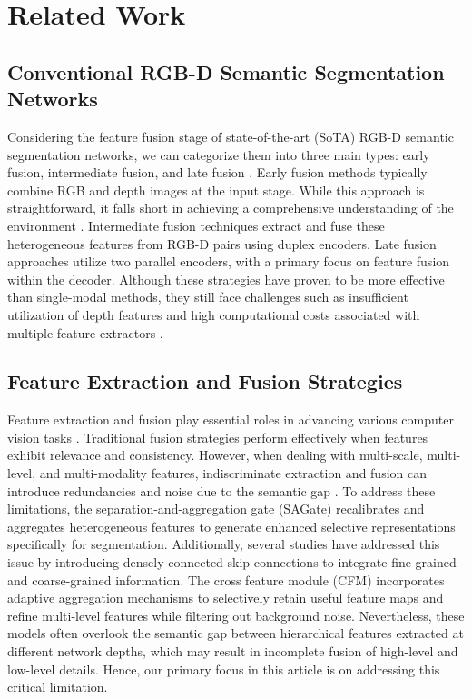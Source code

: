 \section{Related Work}
\label{sec:related_work}

\subsection{Conventional RGB-D Semantic Segmentation Networks}
\label{sec:RGB-D}
Considering the feature fusion stage of state-of-the-art (SoTA) RGB-D semantic segmentation networks, we can categorize them into three main types: early fusion, intermediate fusion, and late fusion \cite{zhang2021deep}. Early fusion methods typically combine RGB and depth images at the input stage. While this approach is straightforward, it falls short in achieving a comprehensive understanding of the environment \cite{zhang2021deep}. Intermediate fusion techniques \cite{fan2020sne-roadseg} extract and fuse these heterogeneous features from RGB-D pairs using duplex encoders. Late fusion approaches \cite{ha2017mfnet,valada2017adapnet,cheng2017locality} utilize two parallel encoders, with a primary focus on feature fusion within the decoder. Although these strategies have proven to be more effective than single-modal methods, they still face challenges such as insufficient utilization of depth features and high computational costs associated with multiple feature extractors \cite{huang2024roadformer+}. 

\subsection{Feature Extraction and Fusion Strategies}
\label{sec:feature}
Feature extraction and fusion play essential roles in advancing various computer vision tasks \cite{hassan2020learning,zhou2021ecffnet,jiang2013salient,zhang2018exfuse}. Traditional fusion strategies perform effectively when features exhibit relevance and consistency. However, when dealing with multi-scale, multi-level, and multi-modality features, indiscriminate extraction and fusion can introduce redundancies and noise due to the semantic gap \cite{wu2024s}. To address these limitations, the separation-and-aggregation gate (SAGate) \cite{chen2020bi} recalibrates and aggregates heterogeneous features to generate enhanced selective representations specifically for segmentation. Additionally, several studies \cite{fan2020sne-roadseg,zhou2019unet++} have addressed this issue by introducing densely connected skip connections to integrate fine-grained and coarse-grained information. The cross feature module (CFM) \cite{wei2020f3net} incorporates adaptive aggregation mechanisms to selectively retain useful feature maps and refine multi-level features while filtering out background noise. Nevertheless, these models often overlook the semantic gap between hierarchical features extracted at different network depths, which may result in incomplete fusion of high-level and low-level details. Hence, our primary focus in this article is on addressing this critical limitation.


